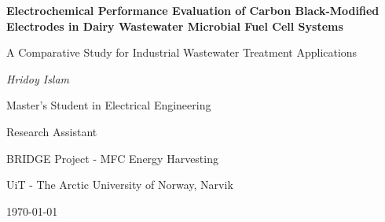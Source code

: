 \documentclass[12pt,a4paper]{article}
\begin{document}
\begin{titlepage}
    \centering
    \vspace*{2cm}
    
    {\huge\bfseries Electrochemical Performance Evaluation of Carbon Black-Modified Electrodes in Dairy Wastewater Microbial Fuel Cell Systems\par}
    
    \vspace{1cm}
    {\Large A Comparative Study for Industrial Wastewater Treatment Applications\par}
    
    \vspace{2cm}
    {\Large\itshape Hridoy Islam\par}
    
    \vspace{1cm}
    {\large Master's Student in Electrical Engineering\par}
    {\large Research Assistant\par}
    
    \vspace{2cm}
    {\large BRIDGE Project - MFC Energy Harvesting\par}
    {\large UiT - The Arctic University of Norway, Narvik\par}
    
    \vspace{2cm}
    {\large\today\par}
    
    \vfill
    
    \begin{abstract}
    This study presents a comprehensive electrochemical evaluation of four distinct anode materials in microbial fuel cell (MFC) configurations treating artificial dairy wastewater over a 232-hour operational period. A novel carbon black-modified stainless steel mesh (CB-SSM) electrode was developed and compared against conventional materials under realistic industrial wastewater conditions. Using artificial dairy wastewater with high organic loading (COD: \SI{5302}{\milli\gram\per\liter}), the CB-SSM electrode demonstrated superior electrochemical performance with sustained voltage output of \SI{0.31}{\volt} and exceptional long-term stability. The study demonstrates the viability of MFC technology for simultaneous wastewater treatment and energy recovery from dairy industry effluents.
    \end{abstract}
    
\end{titlepage}
\end{document}

